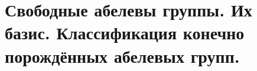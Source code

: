 \section{
    Свободные абелевы группы. Их базис. Классификация конечно порождённых абелевых групп.
}



